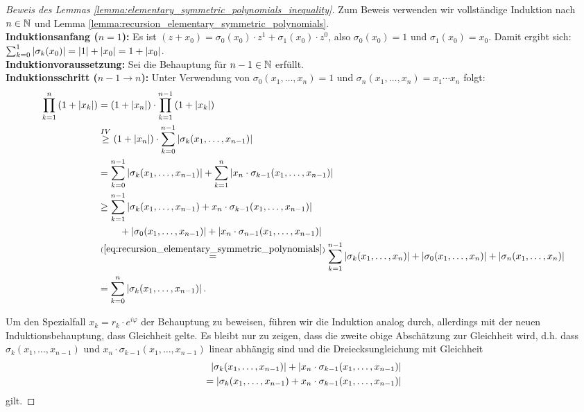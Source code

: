 \begin{proof}[Beweis des Lemmas \ref{lemma:elementary_symmetric_polynomials_inequality}]
    Zum Beweis verwenden wir vollständige Induktion nach $n \in \mathbb{N}$ und
    Lemma \ref{lemma:recursion_elementary_symmetric_polynomials}.\\[0.5em]
    \textbf{Induktionsanfang (\boldmath$n=1$):}
    Es ist $ (z+x_0) = \sigma_0(x_0) \cdot z^1 + \sigma_1(x_0) \cdot z^0$,
    also $\sigma_0(x_0) = 1$ und $\sigma_1(x_0) = x_0$.
    Damit ergibt sich: $\sum_{k=0}^{1} \left\lvert \sigma_k(x_0) \right\rvert = \left\lvert 1 \right\rvert + \left\lvert x_0 \right\rvert = 1 + \left\lvert x_0 \right\rvert$.\\[0.5em]
%
    \noindent \textbf{Induktionvoraussetzung:}
    Sei die Behauptung für $n-1 \in \mathbb{N}$ erfüllt.\\[0.5em]
%
    \noindent \textbf{Induktionsschritt (\boldmath $n\!-\!1 \rightarrow n$):}
    Unter Verwendung von $\sigma_{0}(x_1, \dots, x_n) = 1$
    und $\sigma_{n}(x_1, \dots, x_n) = x_1 \cdots x_n$ folgt:
    \begin{equation*}
      \begin{split}
        \prod_{k=1}^{n} \left( 1 + \left\lvert x_k \right\rvert \right)
        &= ( 1 + \left\lvert x_n \right\rvert ) \cdot \prod_{k=1}^{n-1} \left( 1 + \left\lvert x_k \right\rvert \right)\\
        &\overset{IV}{\geq}  ( 1 + \left\lvert x_n \right\rvert ) \cdot \sum_{k=0}^{n-1} \left\lvert \sigma_{k}(x_1, \dots, x_{n-1}) \right\rvert\\
        &= \sum_{k=0}^{n-1} \left\lvert \sigma_{k}(x_1, \dots, x_{n-1}) \right\rvert
        + \sum_{k=1}^{n} \left\lvert x_n \cdot \sigma_{k-1}(x_1, \dots, x_{n-1}) \right\rvert\\
        &\geq \sum_{k=1}^{n-1} \left\lvert \sigma_{k}(x_1, \dots, x_{n-1}) + x_n \cdot \sigma_{k-1}(x_1, \dots, x_{n-1}) \right\rvert\\
            &\;\;\;\;\;\;\;\; + \left\lvert \sigma_{0}(x_1, \dots, x_{n-1}) \right\rvert + \left\lvert x_n \cdot \sigma_{n-1}(x_1, \dots, x_{n-1}) \right\rvert\\
        &\overset{(\ref{eq:recursion_elementary_symmetric_polynomials})}{=}
        \sum_{k=1}^{n-1} \left\lvert \sigma_{k}(x_1, \dots, x_{n}) \right\rvert + \left\lvert \sigma_{0}(x_1, \dots, x_{n}) \right\rvert + \left\lvert \sigma_{n}(x_1, \dots, x_n) \right\rvert\\
        &= \sum_{k=0}^{n} \left\lvert \sigma_{k}(x_1, \dots, x_{n-1}) \right\rvert.
      \end{split}
    \end{equation*}

    \noindent Um den Spezialfall $x_k = r_k \cdot e^{i \varphi}$ der Behauptung zu beweisen,
    führen wir die Induktion analog durch, allerdings mit der neuen
    Induktionsbehauptung, dass Gleichheit gelte.  Es bleibt nur zu zeigen, dass
    die zweite obige Abschätzung zur Gleichheit wird, d.h. dass
    $\sigma_{k}(x_1, \dots, x_{n-1})$ und $x_n \cdot \sigma_{k-1}(x_1, \dots, x_{n-1})$
    linear abhängig sind und die Dreiecksungleichung mit Gleichheit
    \[
        \begin{split}
            \left\lvert \sigma_{k}(x_1, \dots, x_{n-1}) \right\rvert + \left\lvert x_n \cdot \sigma_{k-1}(x_1, \dots, x_{n-1}) \right\rvert\\
            = \left\lvert \sigma_{k}(x_1, \dots, x_{n-1}) + x_n \cdot \sigma_{k-1}(x_1, \dots, x_{n-1}) \right\rvert
        \end{split}
    \]
    gilt.


\end{proof}
